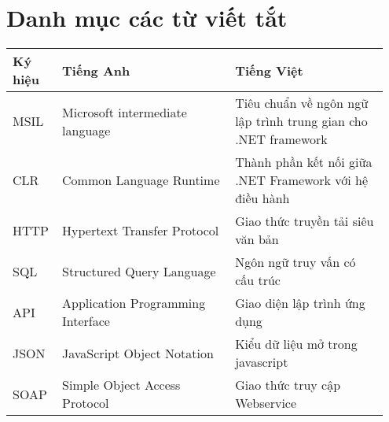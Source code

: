 \thispagestyle{plain}
\chapter*{Danh mục các từ viết tắt}
   \begin{longtable}{m{0.1\linewidth} m{0.45\linewidth} m{0.4\linewidth}}
      \hline 
       \textbf{Ký hiệu} & \textbf{Tiếng Anh} & \textbf{Tiếng Việt} \\ 
      \hline 
      MSIL & Microsoft intermediate language & Tiêu chuẩn về ngôn ngữ lập trình trung gian cho .NET framework\\
      \hline
      CLR& Common Language Runtime & Thành phần kết nối giữa .NET Framework với hệ điều hành\\
      \hline
      HTTP & Hypertext Transfer Protocol & Giao thức truyền tải siêu văn bản\\
      \hline
      SQL&Structured Query Language&Ngôn ngữ truy vấn có cấu trúc\\
      \hline
      API&Application Programming Interface& Giao diện lập trình ứng dụng\\
      \hline
      JSON & JavaScript Object Notation & Kiểu dữ liệu mở trong javascript\\
      \hline
      SOAP & Simple Object Access Protocol & Giao thức truy cập Webservice\\
      \hline
\end{longtable}
